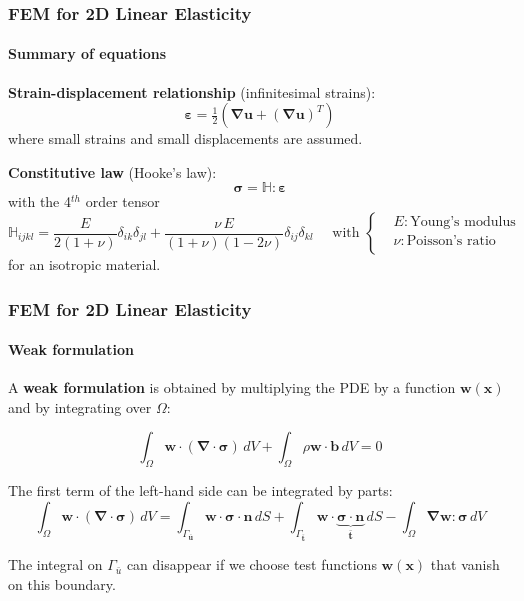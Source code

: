 \documentclass[10pt,xcolor=pdftex,dvipsnames,table]{beamer}
\begin{document}
\begin{frame}
	\frametitle{ FEM for 2D Linear Elasticity }
	\framesubtitle{ Summary of equations }

	\textbf{Strain-displacement relationship} (infinitesimal strains):
	\begin{equation*}
		\boldsymbol{\varepsilon} 
		= \tfrac{1}{2} \left( \boldsymbol{\nabla}\boldsymbol{u} + (\boldsymbol{\nabla}\boldsymbol{u})^T \right) 
	\end{equation*}
	where small strains and small displacements are assumed.


	\textbf{Constitutive law} (Hooke's law):
	\begin{equation*}
		\boldsymbol{\sigma} = \mathbb{H}:\boldsymbol{\varepsilon}
	\end{equation*}
	with the 4$^{th}$ order tensor
	\begin{equation*}
		\mathbb{H}_{ijkl} = \frac{E}{2(1+\nu)} \delta_{ik}\delta_{jl}
		+ \frac{\nu\,E}{(1+\nu)(1-2\nu)}\delta_{ij}\delta_{kl}
		\quad\text{ with }
		\left\{
		\begin{aligned}
			&E : \text{Young's modulus} \\
			&\nu : \text{Poisson's ratio} \\
		\end{aligned}
		\right.
	\end{equation*}	
	for an isotropic material.
\end{frame}




\begin{frame}
	\frametitle{ FEM for 2D Linear Elasticity }
	\framesubtitle{ Weak formulation }
	
	A \textbf{weak formulation} is obtained by multiplying the PDE by a function $\boldsymbol{w}(\boldsymbol{x})$ and by integrating over $\Omega$:
	
	\begin{equation*}
		\int_{\Omega} \boldsymbol{w}\cdot \left(\boldsymbol{\nabla}\cdot\boldsymbol{\sigma}\right)\, dV 
		+ \int_{\Omega} \rho \boldsymbol{w}\cdot \boldsymbol{b}\, dV = 0
	\end{equation*}	


	The first term of the left-hand side can be integrated by parts:
	\begin{equation*}
	\int_{\Omega} \boldsymbol{w}\cdot \left(\boldsymbol{\nabla}\cdot\boldsymbol{\sigma}\right)\, dV 
	= \int_{\Gamma_{\bar{\boldsymbol{u}}}} \boldsymbol{w}\cdot \boldsymbol{\sigma} \cdot \boldsymbol{n}\, dS
	+ \int_{\Gamma_{\bar{\boldsymbol{t}}}} \boldsymbol{w}\cdot \underbrace{\boldsymbol{\sigma} \cdot \boldsymbol{n}}_{\boldsymbol{\bar{t}}}\, dS
	- \int_{\Omega} \boldsymbol{\nabla}\boldsymbol{w} : \boldsymbol{\sigma}\, dV
	\end{equation*}	
	
	The integral on $\Gamma_{\bar{u}}$ can disappear if we choose test functions $\boldsymbol{w}(\boldsymbol{x})$ that vanish on this boundary.
\end{frame}
\end{document}
